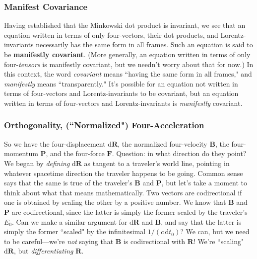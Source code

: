 \documentclass[12pt]{article}
\renewcommand{\vv}[1]{\mathbf{#1}}
\newcommand{\dd}[1]{\mathrm{d}#1}
\begin{document}
\subsubsection{Manifest Covariance}

Having established that the Minkowski dot product is invariant, we see that an equation written in terms of only four-vectors, their dot products, and Lorentz-invariants necessarily has the same form in all frames. Such an equation is said to be \textbf{manifestly covariant}. (More generally, an equation written in terms of only four-\emph{tensors} is manifestly covariant, but we needn't worry about that for now.) In this context, the word \emph{covariant} means ``having the same form in all frames," and \emph{manifestly} means ``transparently." It's possible for an equation not written in terms of four-vectors and Lorentz-invariants to be covariant, but an equation written in terms of four-vectors and Lorentz-invariants is \emph{manifestly} covariant.


\subsubsection[Orthogonality, ("Normalized") Four-Acceleration]{Orthogonality, (``Normalized") Four-Acceleration}

So we have the four-displacement $\dd \vv R$, the normalized four-velocity $\vv B$, the four-momentum $\vv P$, and the four-force $\vv F$. Question: in what direction do they point? We began by \emph{defining} $\dd \vv R$ as tangent to a traveler's world line, pointing in whatever spacetime direction the traveler happens to be going. Common sense says that the same is true of the traveler's $\vv B$ and $\vv P$, but let's take a moment to think about what that means mathematically. Two vectors are codirectional if one is obtained by scaling the other by a positive number. We know that $\vv B$ and $\vv P$ are codirectional, since the latter is simply the former scaled by the traveler's $E_0$. Can we make a similar argument for $\dd \vv R$ and $\vv B$, and say that the latter is simply the former ``scaled" by the infinitesimal $1/(c \, \dd t_0)$? We can, but we need to be careful---we're \emph{not} saying that $\vv B$ is codirectional with $\vv R$! We're ``scaling" $\dd \vv R$, but \emph{differentiating} $\vv R$.
\end{document}
